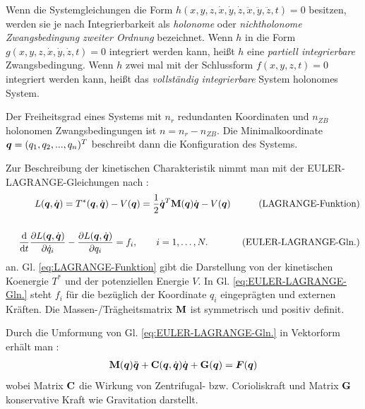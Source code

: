 Wenn die Systemgleichungen die Form $h(x,y,z,\dot{x},\dot{y},\dot{z},\ddot{x}, \ddot{y}, \ddot{z}, t) = 0$ besitzen, werden sie je nach Integrierbarkeit als \emph{holonome} oder \emph{nichtholonome Zwangsbedingung zweiter Ordnung} \cite{oriolo1991control} bezeichnet. Wenn $h$ in die Form $g(x,y,z,\dot{x},\dot{y},\dot{z},t)=0$ integriert werden kann, heißt $h$ eine \emph{partiell integrierbare} Zwangsbedingung. Wenn $h$ zwei mal mit der Schlussform $f(x,y,z,t)=0$ integriert werden kann, heißt das \emph{vollständig integrierbare} System holonomes System.

Der Freiheitsgrad eines Systems mit $n_{r}$ redundanten Koordinaten und $n_{ZB}$ holonomen Zwangsbedingungen ist $n=n_{r}-n_{ZB}$. Die Minimalkoordinate $\boldsymbol q=(q_{1},q_{2},...,q_{n})^{T}$ beschreibt dann die Konfiguration des Systems.

Zur Beschreibung der kinetischen Charakteristik nimmt man mit der EULER-LAGRANGE-Gleichungen nach \cite{janschek2009systementwurf}: 
\begin{eqnarray}
&~&L(\boldsymbol q,\dot{\boldsymbol q}) = T^{\ast}(\boldsymbol q,\dot{\boldsymbol q})-V(\boldsymbol q) = \frac{1}{2}\dot{\boldsymbol q}^{T}\mathbf{M}(\boldsymbol q)\dot{\boldsymbol q}-V(\boldsymbol q)\text{~~~~~~~~~(LAGRANGE-Funktion)}\notag\label{eq:LAGRANGE-Funktion}\\
\\
&~&\frac{\mathrm{d} }{\mathrm{d} t}\frac{\partial L(\boldsymbol q,\dot{\boldsymbol q})}{\partial \dot{q}_{i}}- \frac{\partial L(\boldsymbol q,\dot{\boldsymbol q})}{\partial q_{i}} = f_{i}, ~~~~~~i = 1,\ldots, N.~~~~~~~~~~~\text{(EULER-LAGRANGE-Gln.)}\notag\label{eq:EULER-LAGRANGE-Gln.}\\
\end{eqnarray}
an. Gl. \eqref{eq:LAGRANGE-Funktion} gibt die Darstellung von der kinetischen Koenergie $T^{\ast}$ und der potenziellen Energie $V$. In Gl. \eqref{eq:EULER-LAGRANGE-Gln.} steht $f_{i}$ für die bezüglich der Koordinate $q_{i}$ eingeprägten und externen Kräften. Die Massen-/Trägheitsmatrix $\mathbf{M}$ ist symmetrisch und positiv definit.

Durch die Umformung von Gl. \eqref{eq:EULER-LAGRANGE-Gln.} in Vektorform erhält man \cite{olfati2001nonlinear}:
\begin{eqnarray}
\mathbf{M}(\boldsymbol q)\ddot{\boldsymbol q} + \mathbf{C}(\boldsymbol q,\dot{\boldsymbol q})\dot{\boldsymbol q} + \mathbf{G}(\boldsymbol q) = \boldsymbol F(\boldsymbol q)\label{eq:Vectorform_EULER-LAGRANGE-Gln.}
\end{eqnarray}
wobei Matrix $\mathbf{C}$ die Wirkung von Zentrifugal- bzw. Corioliskraft und Matrix $\mathbf{G}$ konservative Kraft wie Gravitation darstellt.

